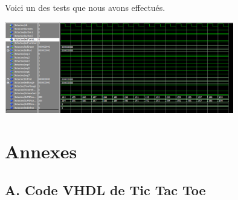 \documentclass{article}
\begin{document}
Voici un des tests que nous avons effectués.

\begin{center} \includegraphics[width=0.75\textwidth]{images/test1.PNG} \end{center}































\appendix










\section*{Annexes}










\subsection*{A. Code VHDL de Tic Tac Toe}


\end{document}
